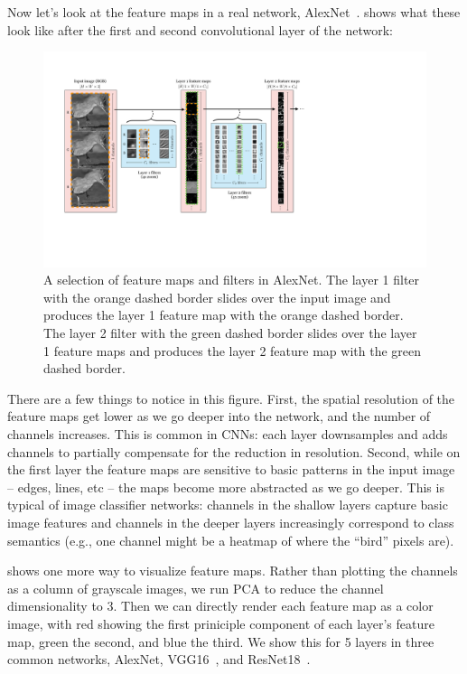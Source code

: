 Now let's look at the feature maps in a real network, AlexNet~\cite{krizhevsky2012imagenet}. \Fig{\ref{fig:convolutional_neural_nets:alexnet_feature_maps}} shows what these look like after the first and second convolutional layer of the network:
\begin{figure}[h!]
    \centerline{
        \includegraphics[width=1.0\linewidth]{./figures/convolutional_neural_nets/alexnet_feature_maps.pdf}}
    \caption{A selection of feature maps and filters in AlexNet. The layer 1 filter with the orange dashed border slides over the input image and produces the layer 1 feature map with the orange dashed border. The layer 2 filter with the green dashed border slides over the layer 1 feature maps and produces the layer 2 feature map with the green dashed border.}
    \label{fig:convolutional_neural_nets:alexnet_feature_maps}
\end{figure}

There are a few things to notice in this figure. First, the spatial resolution of the feature maps get lower as we go deeper into the network, and the number of channels increases. This is common in CNNs: each layer downsamples and adds channels to partially compensate for the reduction in resolution. Second, while on the first layer the feature maps are sensitive to basic patterns in the input image -- edges, lines, etc -- the maps become more abstracted as we go deeper. This is typical of image classifier networks: channels in the shallow layers capture basic image features and channels in the deeper layers increasingly correspond to class semantics (e.g., one channel might be a heatmap of where the ``bird'' pixels are).

\Fig{\ref{fig:convolutional_neural_nets:feature_maps_pca_viz}} shows one more way to visualize feature maps. Rather than plotting the channels as a column of grayscale images, we run PCA to reduce the channel dimensionality to 3. Then we can directly render each feature map as a color image, with red showing the first priniciple component of each layer's feature map, green the second, and blue the third. We show this for 5 layers in three common networks, AlexNet, VGG16~\cite{vgg16}, and ResNet18~\cite{he2016deep}.


